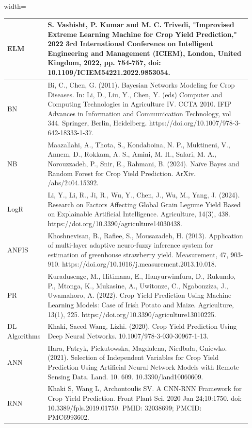 \documentclass[conference]{IEEEtran}
\begin{document}
\begin{table}[htbp]
\begin{adjustbox}{width=\textwidth}
\begin{tabular}{|p{2cm}|p{14cm}|}
\hline
ELM & S. Vashisht, P. Kumar and M. C. Trivedi, "Improvised Extreme Learning Machine for Crop Yield Prediction," 2022 3rd International Conference on Intelligent Engineering and Management (ICIEM), London, United Kingdom, 2022, pp. 754-757, doi: 10.1109/ICIEM54221.2022.9853054. \\
\hline
BN & Bi, C., Chen, G. (2011). Bayesian Networks Modeling for Crop Diseases. In: Li, D., Liu, Y., Chen, Y. (eds) Computer and Computing Technologies in Agriculture IV. CCTA 2010. IFIP Advances in Information and Communication Technology, vol 344. Springer, Berlin, Heidelberg. https://doi.org/10.1007/978-3-642-18333-1-37. \\
\hline
NB & Maazallahi, A., Thota, S., Kondaboina, N. P., Muktineni, V., Annem, D., Rokkam, A. S., Amini, M. H., Salari, M. A., Norouzzadeh, P., Snir, E., Rahmani, B. (2024). Na\"ive Bayes and Random Forest for Crop Yield Prediction. ArXiv. /abs/2404.15392. \\
\hline
LogR & Li, Y., Li, R., Ji, R., Wu, Y., Chen, J., Wu, M., Yang, J. (2024). Research on Factors Affecting Global Grain Legume Yield Based on Explainable Artificial Intelligence. Agriculture, 14(3), 438. https://doi.org/10.3390/agriculture14030438. \\
\hline
ANFIS & Khoshnevisan, B., Rafiee, S., Mousazadeh, H. (2013). Application of multi-layer adaptive neuro-fuzzy inference system for estimation of greenhouse strawberry yield. Measurement, 47, 903-910. https://doi.org/10.1016/j.measurement.2013.10.018. \\
\hline
PR & Kuradusenge, M., Hitimana, E., Hanyurwimfura, D., Rukundo, P., Mtonga, K., Mukasine, A., Uwitonze, C., Ngabonziza, J., Uwamahoro, A. (2022). Crop Yield Prediction Using Machine Learning Models: Case of Irish Potato and Maize. Agriculture, 13(1), 225. https://doi.org/10.3390/agriculture13010225. \\
\hline
DL Algorithms & Khaki, Saeed Wang, Lizhi. (2020). Crop Yield Prediction Using Deep Neural Networks. 10.1007/978-3-030-30967-1-13.\\
\hline
ANN & Hara, Patryk, Piekutowska, Magdalena, Niedbała, Gniewko. (2021). Selection of Independent Variables for Crop Yield Prediction Using Artificial Neural Network Models with Remote Sensing Data. Land. 10. 609. 10.3390/land10060609. \\
\hline
RNN & Khaki S, Wang L, Archontoulis SV. A CNN-RNN Framework for Crop Yield Prediction. Front Plant Sci. 2020 Jan 24;10:1750. doi: 10.3389/fpls.2019.01750. PMID: 32038699; PMCID: PMC6993602.\\

\end{tabular}
\end{adjustbox}
\end{table}
\end{document}

